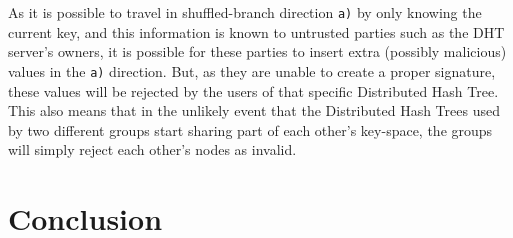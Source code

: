 \documentclass[a4paper]{article}
\begin{document}
As it is possible to travel in shuffled-branch direction \texttt{a)} by only knowing the current key, and this information is known to untrusted parties such as the DHT server's owners, it is possible for these parties to insert extra (possibly malicious) values in the \texttt{a)} direction. But, as they are unable to create a proper signature, these values will be rejected by the users of that specific Distributed Hash Tree. This also means that in the unlikely event that the Distributed Hash Trees used by two different groups start sharing part of each other's key-space, the groups will simply reject each other's nodes as invalid.

\section{Conclusion}
\end{document}
